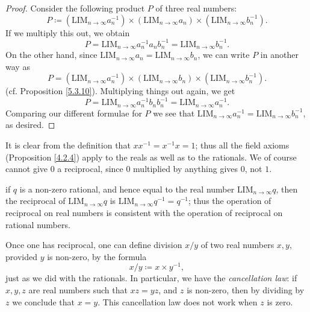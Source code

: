 \begin{proof}
    Consider the following product \(P\) of three real numbers:
    \[
        P \coloneqq (\text{LIM}_{n \to \infty} a_n^{-1}) \times (\text{LIM}_{n \to \infty} a_n) \times (\text{LIM}_{n \to \infty} b_n^{-1}).
    \]
    If we multiply this out, we obtain
    \[
        P = \text{LIM}_{n \to \infty} a_n^{-1} a_n b_n^{-1} = \text{LIM}_{n \to \infty} b_n^{-1}.
    \]
    On the other hand, since \(\text{LIM}_{n \to \infty} a_n = \text{LIM}_{n \to \infty} b_n\), we can write \(P\) in another way as
    \[
        P = (\text{LIM}_{n \to \infty} a_n^{-1}) \times (\text{LIM}_{n \to \infty} b_n) \times (\text{LIM}_{n \to \infty} b_n^{-1}).
    \]
    (cf. Proposition \ref{5.3.10}).
    Multiplying things out again, we get
    \[
        P = \text{LIM}_{n \to \infty} a_n^{-1} b_n b_n^{-1} = \text{LIM}_{n \to \infty} a_n^{-1}.
    \]
    Comparing our different formulae for \(P\) we see that \(\text{LIM}_{n \to \infty} a_n^{-1} = \text{LIM}_{n \to \infty} b_n^{-1}\), as desired.
\end{proof}

\begin{note}
    It is clear from the definition that \(xx^{-1} = x^{-1}x = 1\);
    thus all the field axioms (Proposition \ref{4.2.4}) apply to the reals as well as to the rationals.
    We of course cannot give \(0\) a reciprocal, since \(0\) multiplied by anything gives \(0\), not \(1\).
\end{note}

\begin{note}
    if \(q\) is a non-zero rational, and hence equal to the real number \(\text{LIM}_{n \to \infty} q\), then the reciprocal of \(\text{LIM}_{n \to \infty} q\) is \(\text{LIM}_{n \to \infty} q^{-1} = q^{-1}\);
    thus the operation of reciprocal on real numbers is consistent with the operation of reciprocal on rational numbers.
\end{note}

\begin{note}
    Once one has reciprocal, one can define division \(x / y\) of two real numbers \(x, y\), provided \(y\) is non-zero, by the formula
    \[
        x / y \coloneqq x \times y^{-1},
    \]
    just as we did with the rationals.
    In particular, we have the \emph{cancellation law}:
    if \(x, y, z\) are real numbers such that \(xz = yz\), and \(z\) is non-zero, then by dividing by \(z\) we conclude that \(x = y\).
    This cancellation law does not work when \(z\) is zero.
\end{note}

